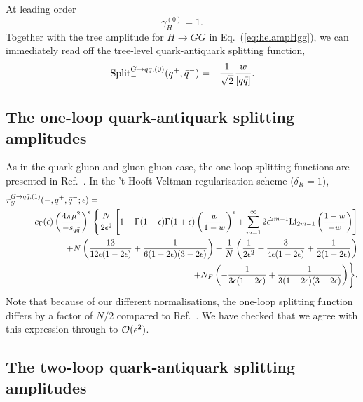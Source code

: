 \documentclass[paper,notoc,nohyper]{JHEP3}
\def\e{\epsilon}
\def\Split{\, {\rm Split}}
\def\NF{N_F}
\def\OMWW{\frac{1-w}{-w}}
\def\Li{{\rm Li}}
\def\e{\epsilon}
\begin{document}
At leading order 
\begin{equation}
\gamma_H^{(0)} = 1.
\end{equation}
Together with the tree amplitude for $H \to GG$ in Eq.~(\ref{eq:helampHgg}), 
we can immediately read off the tree-level quark-antiquark 
splitting function,
\begin{eqnarray}
\Split_{-}^{G \to q\bar q,(0)}(q^{+},\bar{q}^{-})&=&
\frac{1}{\sqrt{2}} \frac{w}{[ q\bar q ]}. 
\end{eqnarray}


\subsection{The one-loop quark-antiquark splitting amplitudes}

As in the quark-gluon and gluon-gluon
case, the one loop splitting functions are presented in 
Ref.~\cite{Bern:split1QCD}. In the 't Hooft-Veltman regularisation scheme
($\delta_R = 1$),
\begin{eqnarray}
\lefteqn{r_{S}^{G \to q\bar q,(1)}(-,q^{+},\bar{q}^{-};\e)=}\nonumber \\
&&
c_{\Gamma}(\e)\left(\frac{4\pi\mu^2}{-s_{q\bar q}}\right)^{\epsilon}
\Biggl\{
\frac{N}{2\epsilon^2}\left[
1-\Gamma(1-\epsilon)\Gamma(1+\epsilon)\left(\frac{w}{1-w}\right)^{\epsilon}
+\sum_{m=1}^{\infty} 2\epsilon^{2m-1} \Li_{2m-1}\left(\OMWW\right)
\right]\nonumber \\
&&\qquad\qquad\qquad+
N\left(\frac{13}{12\e(1-2\e)}+\frac{1}{6(1-2\e)(3-2\e)}\right)
+\frac{1}{N}\left(\frac{1}{2\e^2}+\frac{3}{4\e(1-2\e)}+\frac{1}{2(1-2\e)}\right)\nonumber
\\
&&\qquad\qquad\qquad+\NF\left(-\frac{1}{3\e(1-2\e)}+\frac{1}{3(1-2\e)(3-2\e)}\right)
\Biggr\}.
\end{eqnarray}
Note that because of our different normalisations, the one-loop splitting function differs by a factor of
$N/2$ compared to Ref.~\cite{Bern:split1QCD}. 
We have checked that we agree with this expression through 
to ${\cal O}(\e^2)$.


\subsection{The two-loop quark-antiquark splitting amplitudes}
\end{document}
